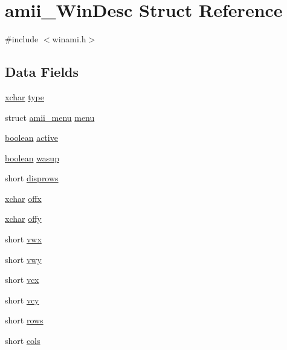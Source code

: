 \hypertarget{structamii__WinDesc}{\section{amii\+\_\+\+Win\+Desc Struct Reference}
\label{structamii__WinDesc}
}


{\ttfamily \#include $<$winami.\+h$>$}

\subsection*{Data Fields}
\begin{DoxyCompactItemize}
\item 
\hyperlink{global_8h_a2043b7d01ce89f4ee2fa6c345a752d32}{xchar} \hyperlink{structamii__WinDesc_ab90130f7f09b474842877b2f71d708e0}{type}
\item 
struct \hyperlink{structamii__menu}{amii\+\_\+menu} \hyperlink{structamii__WinDesc_aeffe06ac39ddf1ea949990646a1bbf0d}{menu}
\item 
\hyperlink{global_8h_a531b10dd351aa162d7dcccd1966308b8}{boolean} \hyperlink{structamii__WinDesc_a0977c321f7baae08763a4f998c2e2c3b}{active}
\item 
\hyperlink{global_8h_a531b10dd351aa162d7dcccd1966308b8}{boolean} \hyperlink{structamii__WinDesc_ab4e4bdac6ab87e8f1cf420814f09e876}{wasup}
\item 
short \hyperlink{structamii__WinDesc_ad73ea3210d2bf3840205b8a4b720f13d}{disprows}
\item 
\hyperlink{global_8h_a2043b7d01ce89f4ee2fa6c345a752d32}{xchar} \hyperlink{structamii__WinDesc_a86d17b0eef27f3993192a5ae457b308f}{offx}
\item 
\hyperlink{global_8h_a2043b7d01ce89f4ee2fa6c345a752d32}{xchar} \hyperlink{structamii__WinDesc_a0d290575fc55a6cee56ab14b3a10d98e}{offy}
\item 
short \hyperlink{structamii__WinDesc_a07fca2931c9e79f29b19e238ee73de0d}{vwx}
\item 
short \hyperlink{structamii__WinDesc_a55e0b7473323fe60385ad4750437b831}{vwy}
\item 
short \hyperlink{structamii__WinDesc_ac72b8cfb771ed88fd3790664587a3076}{vcx}
\item 
short \hyperlink{structamii__WinDesc_a9fb0dc845686391668949b7f47afc912}{vcy}
\item 
short \hyperlink{structamii__WinDesc_a465b4a9c04b3c325f2af2722aac9c5f3}{rows}
\item 
short \hyperlink{structamii__WinDesc_a8ef9da0197015f48920307f3692f2a54}{cols}

\end{DoxyCompactItemize}

